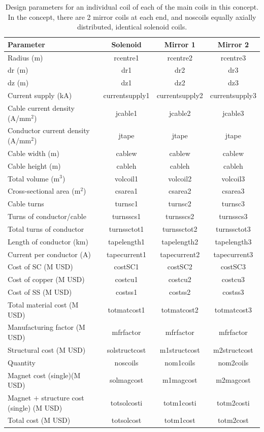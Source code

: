 \begin{table}[h]
\centering
\begin{tabular}{lccc}
\hline
\textbf{Parameter} & \textbf{Solenoid} & \textbf{Mirror 1} & \textbf{Mirror 2} \\
\hline
Radius (m)& rcentre1 & rcentre2 & rcentre3 \\
dr (m)& dr1 & dr2 & dr3 \\
dz (m)& dz1 & dz2 & dz3 \\
Current supply (kA) & currentsupply1 & currentsupply2 & currentsupply3 \\
Cable current density (A/mm$^2$)& jcable1 & jcable2 & jcable3 \\
Conductor current density (A/mm$^2$) & jtape & jtape & jtape \\
Cable width (m)& cablew & cablew & cablew \\
Cable height (m)& cableh & cableh & cableh \\
Total volume (m$^3$)& volcoil1 & volcoil2 & volcoil3 \\
Cross-sectional area (m$^2$)& csarea1 & csarea2 & csarea3 \\
\hline
Cable turns & turnsc1 & turnsc2 & turnsc3 \\
Turns of conductor/cable & turnsscs1 & turnsscs2 & turnsscs3 \\
Total turns of conductor & turnssctot1 & turnssctot2 & turnssctot3  \\
Length of conductor (km)& tapelength1 & tapelength2 & tapelength3 \\
Current per conductor (A)& tapecurrent1 & tapecurrent2 & tapecurrent3 \\
\hline
Cost of SC (M USD)& costSC1 & costSC2 & costSC3 \\
Cost of copper (M USD)& costcu1 & costcu2 & costcu3 \\
Cost of SS (M USD)& costss1 & costss2 & costss3 \\
Total material cost (M USD)&  totmatcost1 & totmatcost2 & totmatcost3 \\
Manufacturing factor (M USD)& mfrfactor & mfrfactor & mfrfactor \\
Structural cost (M USD) & solstructcost & m1structcost & m2structcost \\
Quantity & noscoils & nom1coils & nom2coils \\
Magnet cost (single)(M USD) & solmagcost & m1magcost & m2magcost \\
Magnet $+$ structure cost (single) (M USD) & totsolcosti & totm1costi & totm2costi \\
\hline
Total cost (M USD) & totsolcost & totm1cost & totm2cost \\
\hline
\end{tabular}
\caption{Design parameters for an individual coil of each of the main coils in this concept. In the concept, there are 2 mirror coils at each end, and noscoils equally axially distributed, identical solenoid coils.}
\label{your-table-label}
\end{table}

